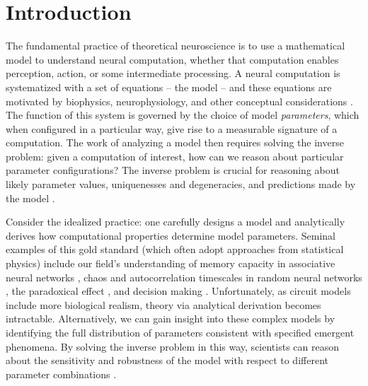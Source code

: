 \documentclass[11pt]{article}
\begin{document}
\section{Introduction}
The fundamental practice of theoretical neuroscience is to use a mathematical model to understand neural computation, whether that computation enables perception, action, or some intermediate processing.  
A neural computation is systematized with a set of equations -- the model -- and these equations are motivated by biophysics, neurophysiology, and other conceptual considerations \cite{kopell1988coupled,  marder1998biophysics, abbott2008theoretical, wang2010neurophysiological}.
The function of this system is governed by the choice of model \emph{parameters}, which when configured in a particular way, give rise to a measurable signature of a computation.   
The work of analyzing a model then requires solving the inverse problem: given a computation of interest, how can we reason about particular parameter configurations?  
The inverse problem is crucial for reasoning about likely parameter values, uniquenesses and degeneracies, and predictions made by the model \cite{gutenkunst2007universally, o2014cell}.

Consider the idealized practice: one carefully designs a model and analytically derives how computational properties determine model parameters.
Seminal examples of this gold standard (which often adopt approaches from statistical physics) include our field's understanding of memory capacity in associative neural networks \cite{hopfield1982neural}, chaos and autocorrelation timescales in random neural networks \cite{sompolinsky1988chaos}, the paradoxical effect \cite{tsodyks1997paradoxical}, and decision making \cite{wong2006recurrent}.
Unfortunately, as circuit models include more biological realism, theory via analytical derivation becomes intractable.
Alternatively, we can gain insight into these complex models by identifying the full distribution of parameters consistent with specified emergent phenomena.
By solving the inverse problem in this way, scientists can reason about the sensitivity and robustness of the model with respect to different parameter combinations \cite{foster1993significance, prinz2004similar, achard2006complex, o2014cell, alonso2019visualization}.
\end{document}
